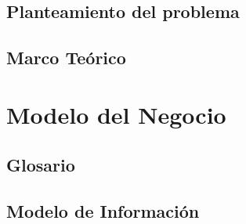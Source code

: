 \documentclass[10pt]{book}
\author{Escuela Superior de Cómputo}
\title{\varProyecto}
\subtitle {\varCveDocumento--\varDocumento}
\begin{document}
    \thispagestyle{empty}

    \maketitle
    
    \makeDocInfo
    \bigskip\\
    \makeObservaciones[3cm]
    \vspace{2cm}
    \makeFirmas

    \frontmatter
    \tableofcontents
    \listoffigures
    \mainmatter


    \chapter{Planteamiento del problema}
    \label{ch:planteamiento}
	
	
	\chapter{Marco Teórico} 
	\label{ch:marco}
	
	
	
	\part{Modelo del Negocio}
	
	\chapter{Glosario}
	\label{chapter:glosario}
	
	
	
	\chapter{Modelo de Información} %
	\label{chapter:modeloInformacion}
	
	
\end{document}
